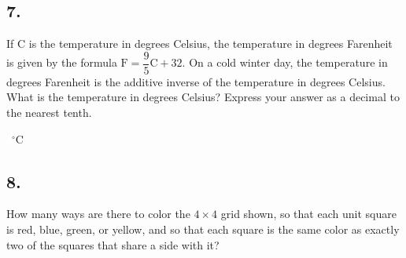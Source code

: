 \documentclass[12pt]{article}
\begin{document}
\subsection*{7.}
If C is the temperature in degrees Celsius, the temperature in degrees Farenheit is given by the formula $\text{F}=\dfrac{9}{5}\text{C}+32$. On a cold winter day, the temperature in degrees Farenheit is the additive inverse of the temperature in degrees Celsius. What is the temperature in degrees Celsius? Express your answer as a decimal to the nearest tenth. 

\nopagebreak

\fbox{\phantom{ANSWER}}~$^{\circ}$C

\begin{answer}
%
\end{answer}



\subsection*{8.}
How many ways are there to color the $4 \times 4$ grid shown, so that each unit square is red, blue, green, or yellow, and so that each square is the same color as exactly two of the squares that share a side with it?
\end{document}
